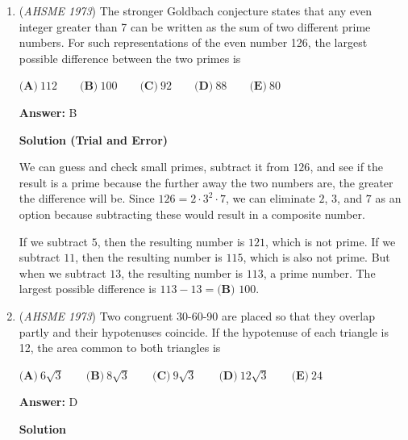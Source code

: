 \begin{enumerate}
 



\textbf{Solution 2}

Each face has $100$ cubes, so multiply by six to get $600$.  However, we overcounted each small cube on the edge but not on corner of the big cube once and each small cube on the corner of the big cube twice.  Thus, there are $600 - (12 \cdot 8 + 2 \cdot 8) = \boxed{\textbf{(C) } 488}$ cubes that have at least one face painted.

 


	\item (\textit{AHSME 1973}) The stronger Goldbach conjecture states that any even integer greater than 7 can be written as the sum of two different prime numbers. For such representations of the even number 126, the largest possible difference between the two primes is 


  $\textbf{(A)}\ 112\qquad\textbf{(B)}\ 100\qquad\textbf{(C)}\ 92\qquad\textbf{(D)}\ 88\qquad\textbf{(E)}\ 80$

 \textbf{Answer: }B



\textbf{Solution (Trial and Error)}

We can guess and check small primes, subtract it from $126$, and see if the result is a prime because the further away the two numbers are, the greater the difference will be.  Since $126 = 2 \cdot 3^2 \cdot 7$, we can eliminate $2$, $3$, and $7$ as an option because subtracting these would result in a composite number.

 If we subtract $5$, then the resulting number is $121$, which is not prime.  If we subtract $11$, then the resulting number is $115$, which is also not prime.  But when we subtract $13$, the resulting number is $113$, a prime number.  The largest possible difference is $113-13=\boxed{\textbf{(B) } 100}$.

 


	\item (\textit{AHSME 1973}) Two congruent 30-60-90 are placed so that they overlap partly and their hypotenuses coincide. If the hypotenuse of each triangle is 12, the area common to both triangles is 


  $\textbf{(A)}\ 6\sqrt3\qquad\textbf{(B)}\ 8\sqrt3\qquad\textbf{(C)}\ 9\sqrt3\qquad\textbf{(D)}\ 12\sqrt3\qquad\textbf{(E)}\ 24$

 \textbf{Answer: }D



\textbf{Solution}



\end{enumerate}
